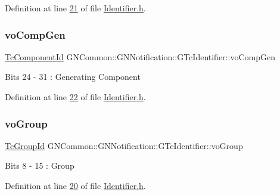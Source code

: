 Definition at line \mbox{\hyperlink{_identifier_8h_source_l00021}{21}} of file \mbox{\hyperlink{_identifier_8h_source}{Identifier.\+h}}.

\mbox{\label{class_g_n_common_1_1_g_n_notification_1_1_g_tc_identifier_a456c1d9ad55bf0e31b8cca87cc1ce30e}} 
\subsubsection{\texorpdfstring{vo\+Comp\+Gen}{voCompGen}}
{\footnotesize\ttfamily \mbox{\hyperlink{namespace_g_n_common_1_1_g_n_notification_a24173724db4e769e5cf4bc03c70c34cd}{Tc\+Component\+Id}} G\+N\+Common\+::\+G\+N\+Notification\+::\+G\+Tc\+Identifier\+::vo\+Comp\+Gen}

Bits 24 -\/ 31 \+: Generating Component 

Definition at line \mbox{\hyperlink{_identifier_8h_source_l00022}{22}} of file \mbox{\hyperlink{_identifier_8h_source}{Identifier.\+h}}.

\mbox{\label{class_g_n_common_1_1_g_n_notification_1_1_g_tc_identifier_a78b2dec674749088b4fe661a9e26609f}} 
\subsubsection{\texorpdfstring{vo\+Group}{voGroup}}
{\footnotesize\ttfamily \mbox{\hyperlink{namespace_g_n_common_1_1_g_n_notification_af1f68a1b00e03ffcf38b56701fb86167}{Tc\+Group\+Id}} G\+N\+Common\+::\+G\+N\+Notification\+::\+G\+Tc\+Identifier\+::vo\+Group}

Bits 8 -\/ 15 \+: Group 

Definition at line \mbox{\hyperlink{_identifier_8h_source_l00020}{20}} of file \mbox{\hyperlink{_identifier_8h_source}{Identifier.\+h}}.

